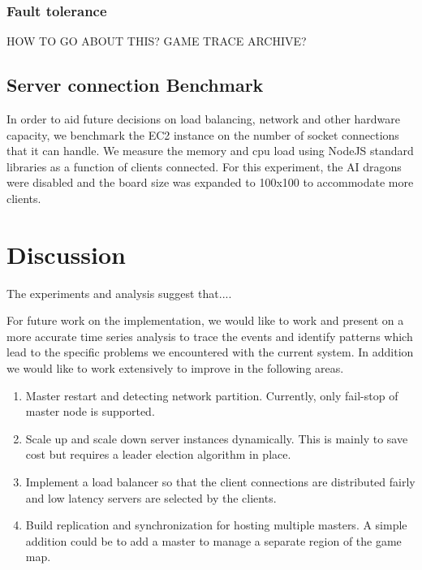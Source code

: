 \documentclass[a4paper]{IEEEtran}
\begin{document}
  \subsubsection{Fault tolerance}

  HOW TO GO ABOUT THIS? GAME TRACE ARCHIVE?

  \subsection{Server connection Benchmark}

  In order to aid future decisions on load balancing, network and other hardware capacity, we benchmark the EC2 instance on the number of socket connections that it can handle. We measure the memory and cpu load using NodeJS standard libraries as a function of clients connected. For this experiment, the AI dragons were disabled and the board size was expanded to 100x100 to accommodate more clients.
  
  \section{Discussion}
  
  \label{sec:discussion}
  
  The experiments and analysis suggest that....
  
  For future work on the implementation, we would like to work and present on a more accurate time
  series analysis to trace the events and identify patterns which lead to the specific problems
  we encountered with the current system. In addition we would like to work extensively to improve in the following areas.
  
  \begin{enumerate}
    \item Master restart and detecting network partition. Currently, only fail-stop of master node is supported.
    \item Scale up and scale down server instances dynamically. This is mainly to save cost but requires a leader election algorithm in place.
    \item Implement a load balancer so that the client connections are distributed fairly and low latency servers are selected by the clients. 
    \item Build replication and synchronization for hosting multiple masters. A simple addition could be to add a master to manage a separate region of the game map.
  \end{enumerate}
  
\end{document}
